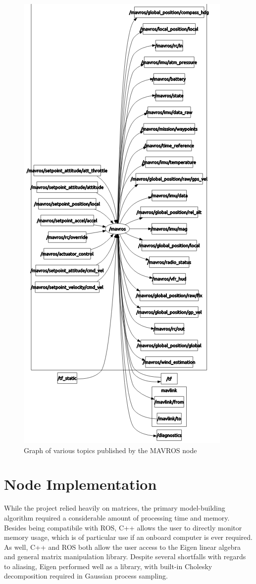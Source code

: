 \documentclass[12pt]{report}
\begin{document}
\begin{figure}[!ht]
	\centering
	\includegraphics[scale=0.6]{mavros_rqt_graph.png}
	\caption{Graph of various topics published by the MAVROS node}
	\label{fig:mavros_rqt_graph}
\end{figure}

\section{Node Implementation}
While the project relied heavily on matrices, the primary model-building algorithm required a considerable amount of processing time and memory. Besides being compatibile with ROS, C++ allows the user to directly monitor memory usage, which is of particular use if an onboard computer is ever required. As well, C++ and ROS both allow the user access to the Eigen linear algebra and general matrix manipulation library. Despite several shortfalls with regards to aliasing, Eigen performed well as a library, with built-in Cholesky decomposition required in Gaussian process sampling.
\end{document}
